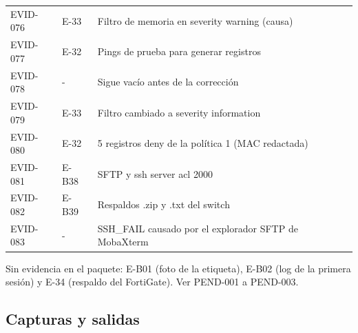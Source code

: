 \documentclass[11pt,a4paper]{article}
\begin{document}
{\begin{longtable}{L{1.6cm} L{2.1cm} L{11.6cm}}
  EVID-076 & E-33 & Filtro de memoria en severity warning (causa)\\
  EVID-077 & E-32 & Pings de prueba para generar registros\\
  EVID-078 & - & Sigue vacío antes de la corrección\\
  EVID-079 & E-33 & Filtro cambiado a severity information\\
  EVID-080 & E-32 & 5 registros deny de la política 1 (MAC redactada)\\
  EVID-081 & E-B38 & SFTP y ssh server acl 2000\\
  EVID-082 & E-B39 & Respaldos .zip y .txt del switch\\
  EVID-083 & - & SSH\_FAIL causado por el explorador SFTP de MobaXterm\\
  \bottomrule
\end{longtable}
}

Sin evidencia en el paquete: E-B01 (foto de la etiqueta), E-B02 (log de la primera sesión) y E-34 (respaldo del FortiGate). Ver PEND-001 a PEND-003.

\subsection*{Capturas y salidas}
\end{document}

